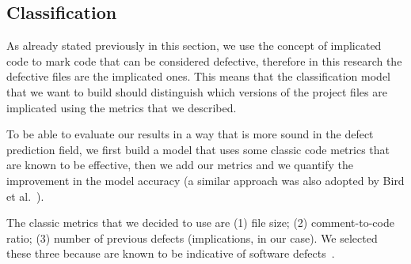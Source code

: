 \subsection{Classification}
\label{sec:classification-overview}
As already stated previously in this section, we use the concept of implicated code to mark code that can be considered defective, therefore in this research the defective files are the implicated ones. This means that the classification model that we want to build should distinguish which versions of the project files are implicated using the metrics that we described. 

To be able to evaluate our results in a way that is more sound in the defect prediction field, we first build a model that uses some classic code metrics that are known to be effective, then we add our metrics and we quantify the improvement in the model accuracy (a similar approach was also adopted by Bird et al.~\cite{bird:original}).

The classic metrics that we decided to use are (1) file size; (2) comment-to-code ratio; (3) number of previous defects (implications, in our case). We selected these three because are known to be indicative of software defects~\cite{Rahman:2013, d2012evaluating}.